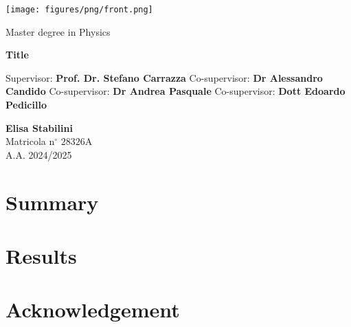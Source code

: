 \documentclass{book}
\theoremstyle{definition}
\begin{document}
\frontmatter
{
\thispagestyle{empty}

\centerline{
\texttt{[image: figures/png/front.png]}
}



\begin{center}
{\Large  Master degree in Physics }
\end{center}


\vskip1.5cm
\begin{center}
{\fontsize{15}{20}\selectfont \textbf{Title\\}}
\end{center}


{\large
\vskip 20mm Supervisor:
\vskip 0.2mm \large  \textbf{Prof. Dr. Stefano Carrazza}
\vskip 5mm
\large Co-supervisor:
\vskip 0.2mm
\large \textbf{Dr Alessandro Candido}
\vskip 5mm
\large Co-supervisor:
\vskip 0.2mm
\large \textbf{Dr Andrea Pasquale}
\vskip 5mm
\large Co-supervisor:
\vskip 0.2mm
\large \textbf{Dott Edoardo Pedicillo}
}
}

\vskip 2cm
\noindent
\hfill
\parbox[t]{7cm}{
    \large
    \raggedright
    \textbf{Elisa Stabilini} \\
    Matricola n$^\circ$ $28326\mathrm{A}$ \\
    A.A. 2024/2025
}  
\clearpage


\clearpage
\tableofcontents
\clearpage

\chapter*{Summary}
\chapter{Results}

%


\chapter*{Acknowledgement}
\end{document}
